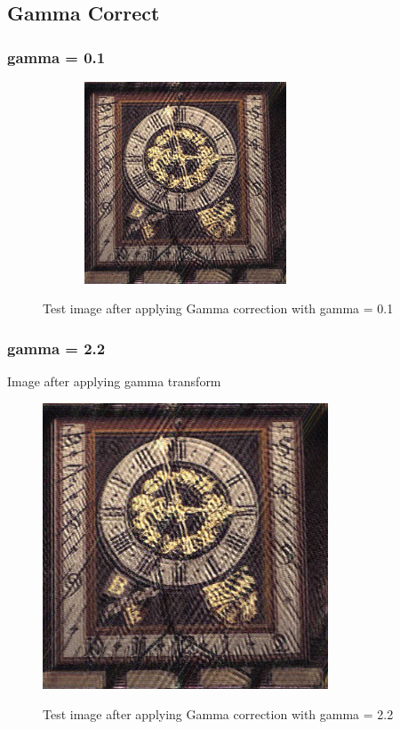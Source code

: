 \documentclass{article}
\begin{document}
\subsection{Gamma Correct}
\subsubsection{gamma = 0.1}
\begin{figure}[htb]

\begin{minipage}[b]{1.0\linewidth}
  \centering
  \centerline{\includegraphics[width=8.5cm,height=6cm,keepaspectratio]{temp.jpg}}
  \centerline{Test image after applying Gamma correction with gamma = 0.1}\medskip
\end{minipage}
%
\end{figure}
\subsubsection[h]{gamma = 2.2}Image after applying gamma transform 
\begin{figure}[h]

\begin{minipage}[b]{1.0\linewidth}
  \centering
  \centerline{\includegraphics[width=8.5cm]{temp.jpg}}
  \centerline{Test image after applying Gamma correction with gamma = 2.2}\medskip
\end{minipage}
%
\end{figure}
\end{document}
